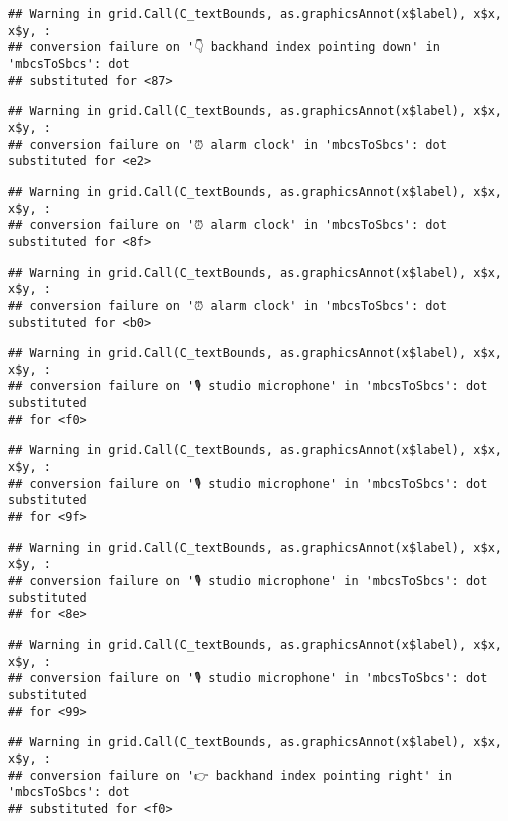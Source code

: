 \documentclass[
]{article}
\begin{document}
\begin{verbatim}
## Warning in grid.Call(C_textBounds, as.graphicsAnnot(x$label), x$x, x$y, :
## conversion failure on '👇 backhand index pointing down' in 'mbcsToSbcs': dot
## substituted for <87>
\end{verbatim}

\begin{verbatim}
## Warning in grid.Call(C_textBounds, as.graphicsAnnot(x$label), x$x, x$y, :
## conversion failure on '⏰ alarm clock' in 'mbcsToSbcs': dot substituted for <e2>
\end{verbatim}

\begin{verbatim}
## Warning in grid.Call(C_textBounds, as.graphicsAnnot(x$label), x$x, x$y, :
## conversion failure on '⏰ alarm clock' in 'mbcsToSbcs': dot substituted for <8f>
\end{verbatim}

\begin{verbatim}
## Warning in grid.Call(C_textBounds, as.graphicsAnnot(x$label), x$x, x$y, :
## conversion failure on '⏰ alarm clock' in 'mbcsToSbcs': dot substituted for <b0>
\end{verbatim}

\begin{verbatim}
## Warning in grid.Call(C_textBounds, as.graphicsAnnot(x$label), x$x, x$y, :
## conversion failure on '🎙 studio microphone' in 'mbcsToSbcs': dot substituted
## for <f0>
\end{verbatim}

\begin{verbatim}
## Warning in grid.Call(C_textBounds, as.graphicsAnnot(x$label), x$x, x$y, :
## conversion failure on '🎙 studio microphone' in 'mbcsToSbcs': dot substituted
## for <9f>
\end{verbatim}

\begin{verbatim}
## Warning in grid.Call(C_textBounds, as.graphicsAnnot(x$label), x$x, x$y, :
## conversion failure on '🎙 studio microphone' in 'mbcsToSbcs': dot substituted
## for <8e>
\end{verbatim}

\begin{verbatim}
## Warning in grid.Call(C_textBounds, as.graphicsAnnot(x$label), x$x, x$y, :
## conversion failure on '🎙 studio microphone' in 'mbcsToSbcs': dot substituted
## for <99>
\end{verbatim}

\begin{verbatim}
## Warning in grid.Call(C_textBounds, as.graphicsAnnot(x$label), x$x, x$y, :
## conversion failure on '👉 backhand index pointing right' in 'mbcsToSbcs': dot
## substituted for <f0>
\end{verbatim}
\end{document}
